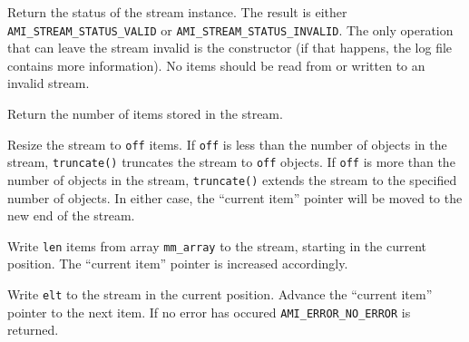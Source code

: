 \etabb


  
 \clearpage

  \btabb
     {Return the status
    of the stream instance. The result is either
    \lstinline|AMI_STREAM_STATUS_VALID| or
    \lstinline|AMI_STREAM_STATUS_INVALID|. The only operation that can
    leave the stream invalid is the constructor (if that happens, the log
    file contains more information). No items should be read from or
    written to an invalid stream.}
  
    {Return the number of items stored in
    the stream.}  
    
      {Resize the stream to
      \lstinline|off| items. If \lstinline|off| is less than the
      number of objects in the stream, \lstinline|truncate()|
      truncates the stream to \lstinline|off| objects. If
      \lstinline|off| is more than the number of objects in the
      stream, \lstinline|truncate()| extends the stream to the
      specified number of objects. In either case, the ``current
      item'' pointer will be moved to the new end of the stream.}
    
      {Write
      \lstinline|len| items from array \lstinline|mm_array| to the
      stream, starting in the current position. The ``current item''
      pointer is increased accordingly.}  
    
      {Write \lstinline|elt| to
      the stream in the current position. Advance the ``current item''
      pointer to the next item. If no error has occured
      \lstinline|AMI_ERROR_NO_ERROR| is
      returned.} 
  
  \etabb
{}



